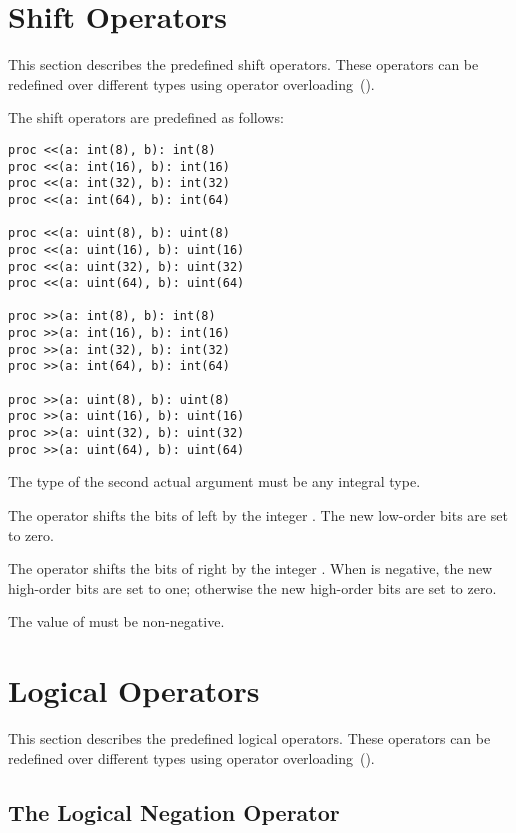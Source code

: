 \pagebreak
\section{Shift Operators}
\label{Shift_Operators}

This section describes the predefined shift operators.  These
operators can be redefined over different types using operator
overloading~().

The shift operators are predefined as follows:
\begin{chapel}
\begin{verbatim}
proc <<(a: int(8), b): int(8)
proc <<(a: int(16), b): int(16)
proc <<(a: int(32), b): int(32)
proc <<(a: int(64), b): int(64)

proc <<(a: uint(8), b): uint(8)
proc <<(a: uint(16), b): uint(16)
proc <<(a: uint(32), b): uint(32)
proc <<(a: uint(64), b): uint(64)

proc >>(a: int(8), b): int(8)
proc >>(a: int(16), b): int(16)
proc >>(a: int(32), b): int(32)
proc >>(a: int(64), b): int(64)

proc >>(a: uint(8), b): uint(8)
proc >>(a: uint(16), b): uint(16)
proc >>(a: uint(32), b): uint(32)
proc >>(a: uint(64), b): uint(64)
\end{verbatim}
\end{chapel}
The type of the second actual argument must be any integral type.

The \chpl{<<} operator shifts the bits of  left by the
integer .  The new low-order bits are set to zero.

The \chpl{>>} operator shifts the bits of  right by the
integer .  When  is negative, the new high-order bits
are set to one; otherwise the new high-order bits are set to zero.

The value of  must be non-negative.

\section{Logical Operators}
\label{Logical_Operators}

This section describes the predefined logical operators.  These
operators can be redefined over different types using operator
overloading~().

\subsection{The Logical Negation Operator}
\label{Logical_Negation_Operators}


